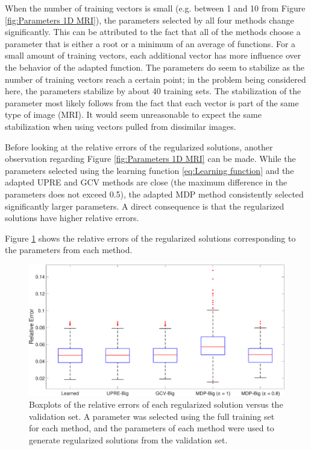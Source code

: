 \documentclass[12pt]{article}
\begin{document}
\noindent When the number of training vectors is small (e.g. between 1 and 10 from Figure \ref{fig:Parameters 1D MRI}), the parameters selected by all four methods change significantly. This can be attributed to the fact that all of the methods choose a parameter that is either a root or a minimum of an average of functions. For a small amount of training vectors, each additional vector has more influence over the behavior of the adapted function. The parameters do seem to stabilize as the number of training vectors reach a certain point; in the problem being considered here, the parameters stabilize by about 40 training sets. The stabilization of the parameter most likely follows from the fact that each vector is part of the same type of image (MRI). It would seem unreasonable to expect the same stabilization when using vectors pulled from dissimilar images. \par 
Before looking at the relative errors of the regularized solutions, another observation regarding Figure \ref{fig:Parameters 1D MRI} can be made. While the parameters selected using the learning function \eqref{eq:Learning function} and the adapted UPRE and GCV methods are close (the maximum difference in the parameters does not exceed 0.5), the adapted MDP method consistently selected significantly larger parameters. A direct consequence is that the regularized solutions have higher relative errors. \par
Figure \ref{fig:Errors 1D MRI} shows the relative errors of the regularized solutions corresponding to the parameters from each method. 

\begin{figure}[ht]
\includegraphics[scale=0.36]{Figures/Errors1D_mri}
\caption{Boxplots of the relative errors of each regularized solution versus the validation set. A parameter was selected using the full training set for each method, and the parameters of each method were used to generate regularized solutions from the validation set.}
\label{fig:Errors 1D MRI}
\end{figure}
\end{document}
